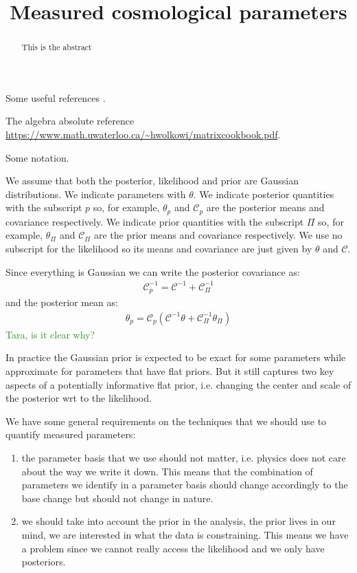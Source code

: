 \documentclass[aps,nofootinbib,notitlepage,superscriptaddress,twocolumn,10pt,prd]{revtex4-1}
\newcommand{\mr}[1]{\textcolor{ForestGreen}{#1}}
\begin{document}
\title{Measured cosmological parameters}

\begin{abstract}
%
This is the abstract
%
\end{abstract}

%
\maketitle
%

Some useful references \cite{Raveri:2018wln,Raveri:2019gdp,Raveri:2021wfz}.

The algebra absolute reference \url{https://www.math.uwaterloo.ca/~hwolkowi/matrixcookbook.pdf}.

Some notation.

We assume that both the posterior, likelihood and prior are Gaussian distributions.
We indicate parameters with $\theta$.
We indicate posterior quantities with the subscript $p$ so, for example, $\theta_p$ and $\mathcal{C}_p$ are the posterior means and covariance respectively.
We indicate prior quantities with the subscript $\Pi$ so, for example, $\theta_\Pi$ and $\mathcal{C}_\Pi$ are the prior means and covariance respectively.
We use no subscript for the likelihood so its means and covariance are just given by $\theta$ and $\mathcal{C}$.

Since everything is Gaussian we can write the posterior covariance as:
\begin{align}
\mathcal{C}_p^{-1} = \mathcal{C}^{-1} + \mathcal{C}_\Pi^{-1} 
\end{align}
and the posterior mean as:
\begin{align}
\theta_p = \mathcal{C}_p ( \mathcal{C}^{-1}\theta + \mathcal{C}_\Pi^{-1} \theta_\Pi)
\end{align}
\mr{Tara, is it clear why?}

In practice the Gaussian prior is expected to be exact for some parameters while approximate for parameters that have flat priors.
But it still captures two key aspects of a potentially informative flat prior, i.e. changing the center and scale of the posterior wrt to the likelihood.

We have some general requirements on the techniques that we should use to quantify measured parameters:
\begin{enumerate}
\item the parameter basis that we use should not matter, i.e. physics does not care about the way we write it down.
This means that the combination of parameters we identify in a parameter basis should change accordingly to the base change but should not change in nature.
\item we should take into account the prior in the analysis, the prior lives in our mind, we are interested in what the data is constraining.
This means we have a problem since we cannot really access the likelihood and we only have posteriors.
\end{enumerate}
\end{document}
